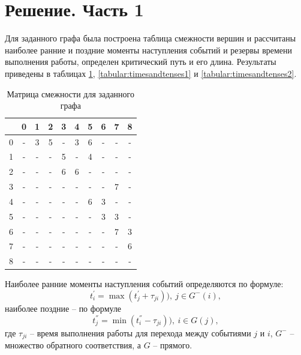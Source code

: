 \documentclass[a4paper,14pt]{extarticle}
\begin{document}
\section{Решение. Часть 1}

Для заданного графа была построена таблица смежности вершин и рассчитаны наиболее ранние и поздние моменты наступления событий и резервы времени выполнения работы, определен критический путь и его длина. Результаты приведены в таблицах \ref{tabular:timesandtenses}, \ref{tabular:timesandtenses1} и \ref{tabular:timesandtenses2}.

\begin{table}[H]
\caption{Матрица смежности для заданного графа}
\label{tabular:timesandtenses}
\begin{center}
\begin{tabular}{|c|c|c|c|c|c|c|c|c|c|}
\hline
  & 0 & 1 & 2 & 3 & 4 & 5 & 6 & 7 & 8\\ \hline
0 & - & 3 & 5 & - & 3 & 6 & - & - & -\\ \hline
1 & - & - & - & 5 & - & 4 & - & - & -\\ \hline
2 & - & - & - & 6 & 6 & - & - & - & -\\ \hline
3 & - & - & - & - & - & - & - & 7 & -\\ \hline
4 & - & - & - & - & - & 6 & 3 & - & -\\ \hline
5 & - & - & - & - & - & - & 3 & 3 & -\\ \hline
6 & - & - & - & - & - & - & - & 7 & 3\\ \hline
7 & - & - & - & - & - & - & - & - & 6\\ \hline
8 & - & - & - & - & - & - & - & - & -\\ \hline
\end{tabular}
\end{center}
\end{table}

Наиболее ранние моменты наступления событий определяются по формуле: 
$$t^{'}_{i} = \max ( t^{'}_{j} + \tau_{ji})), ~ j \in G^{-} (i),$$
наиболее поздние -- по формуле
$$t^{''}_{j} = \min ( t^{''}_{i} - \tau_{ji})), ~ i \in G (j),$$
где $\tau_{ji}$ -- время выполнения работы для перехода между событиями $j$ и $i$, $G^{-}$ -- множество обратного соответствия, а $G$ -- прямого.


\end{document}
